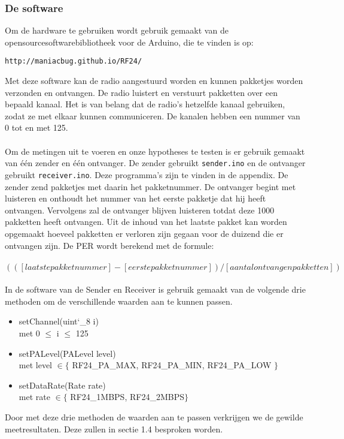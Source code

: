 \documentclass{article}
\begin{document}
\subsubsection{De software}
Om de hardware te gebruiken wordt gebruik gemaakt van de opensourcesoftwarebibliotheek voor de Arduino, die te vinden is op: \begin{verbatim}http://maniacbug.github.io/RF24/ \end{verbatim} 
Met deze software kan de radio aangestuurd worden en kunnen pakketjes worden verzonden en ontvangen. De radio luistert en verstuurt pakketten over een bepaald kanaal. Het is van belang dat de radio's hetzelfde kanaal gebruiken, zodat ze met elkaar kunnen communiceren. De kanalen hebben een nummer van 0 tot en met 125.\\
\\
Om de metingen uit te voeren en onze hypotheses te testen is er gebruik gemaakt van \'{e}\'{e}n zender en \'{e}\'{e}n ontvanger. De zender gebruikt \texttt{sender.ino} en de ontvanger gebruikt \texttt{receiver.ino}. Deze programma's zijn te vinden in de appendix. De zender zend pakketjes met daarin het pakketnummer. De ontvanger begint met luisteren en onthoudt het nummer van het eerste pakketje dat hij heeft ontvangen. Vervolgens zal de ontvanger blijven luisteren totdat deze 1000 pakketten heeft ontvangen. Uit de inhoud van het laatste pakket kan worden opgemaakt hoeveel pakketten er verloren zijn gegaan voor de duizend die er ontvangen zijn. De PER wordt berekend met de formule:\\
\\
\indent	$(([laatste pakketnummer]-[eerste pakketnummer])/[aantal ontvangen pakketten])$\\
\\
In de software van de Sender en Receiver is gebruik gemaakt van de volgende drie methoden om de verschillende waarden aan te kunnen passen. 
\begin{itemize}
	\item setChannel(uint\char`_8 i) \\
	met 0 $\leq$ i $\leq$ 125
	\item setPALevel(PALevel level) \\
	met level $\in \{$  RF24\_PA\_MAX, RF24\_PA\_MIN, RF24\_PA\_LOW $\}$
	\item setDataRate(Rate rate) \\
	met rate $\in \{$ RF24\_1MBPS, RF24\_2MBPS$\}$
\end{itemize}
Door met deze drie methoden de waarden aan te passen verkrijgen we de gewilde meetresultaten. Deze zullen in sectie 1.4 besproken worden.
\end{document}

